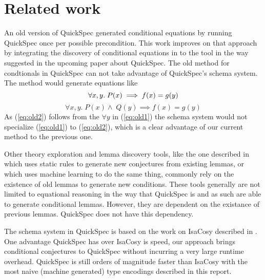 \section{Related work}
An old version of QuickSpec generated conditional
equations by running QuickSpec once per possible precondition.
This work improves on that approach by integrating the
discovery of conditional equations in to the tool
in the way suggested in the upcoming paper about
QuickSpec.
The old method for condtionals in QuickSpec can 
not take advantage of QuickSpec's schema system.
The method would generate equations like
\begin{equation}\label{eq:old1}
    \forall x, y.\;P(x)\implies f(x) = g(y)\\
\end{equation}
\begin{equation}\label{eq:old2}
    \forall x, y.\;P(x)\wedge\;Q(y)\implies f(x) = g(y)
\end{equation}
As (\ref{eq:old2}) follows from the $\forall y$ in (\ref{eq:old1})
the schema system would not specialize (\ref{eq:old1}) to
(\ref{eq:old2}), which is a clear advantage of
our current method to the previous one.

Other theory exploration and lemma
discovery tools, like the one described in
\cite{Buchberger2001} which uses static rules
to generate new conjectures from existing
lemmas, or \cite{heras2013} which uses
machine learning to do the same thing, 
commonly rely on the existence of old lemmas
to generate new conditions. These tools generally
are not limited to equational reasoning in the way that QuickSpec
is and as such are able to generate conditional lemmas.
However, they are dependent on the existance of
previous lemmas. QuickSpec does not have this dependency.

The schema system in QuickSpec is based on the 
work on IsaCosy described in \cite{Johansson2011}. One advantage
QuickSpec has over IsaCosy is speed, our approach brings
conditional conjectures to QuickSpec without incurring
a very large runtime overhead. QuickSpec is still orders of
magnitude faster than IsaCosy with the most naive (machine generated)
type encodings described in this report.
